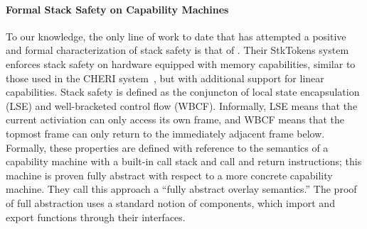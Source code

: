 \documentclass[acmsmall,review,anonymous]{acmart}\settopmatter{printfolios=true,printccs=false,printacmref=false}
\begin{document}
{\paragraph{Formal Stack Safety on Capability Machines}
%
To our knowledge, the only line of work to date that has attempted
a positive and formal characterization of stack safety
is that of \citet{SkorstengaardSTKJFP}. Their
StkTokens system enforces stack safety on hardware equipped with
memory capabilities, similar to those used in the CHERI system~\citep{Woodruff+14,Chisnall+15}, but
with additional support for linear capabilities.
Stack safety is defined as the conjuncton of local state encapsulation (LSE) and
well-bracketed control flow (WBCF).
Informally, LSE means that the current activiation can only access its own frame,
and WBCF means that the topmost frame can only return to
the immediately adjacent frame below. Formally, these properties are defined
with reference to the semantics of a
capability machine with a built-in call stack and call and return
instructions; this machine is proven fully abstract with respect to a more
concrete capability machine.  They call this approach a ``fully abstract overlay semantics.''
The proof of full abstraction uses a standard notion of components, which
import and export functions through their interfaces.

}
\end{document}
